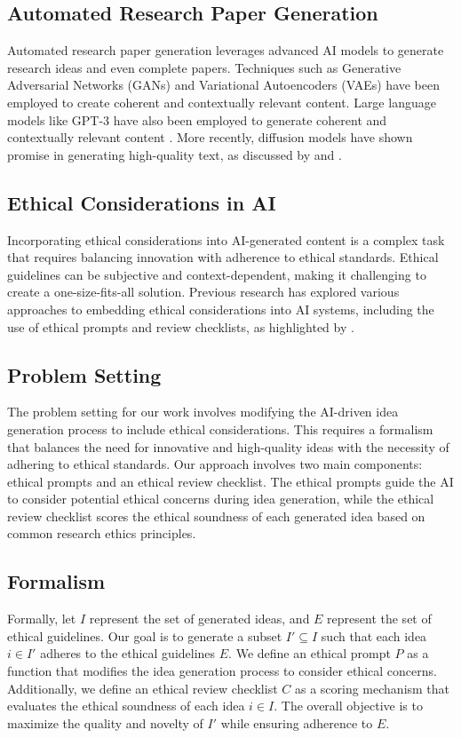 \documentclass{article} %
\begin{document}
\subsection{Automated Research Paper Generation}
Automated research paper generation leverages advanced AI models to generate research ideas and even complete papers. Techniques such as Generative Adversarial Networks (GANs) \citep{gan} and Variational Autoencoders (VAEs) \citep{vae} have been employed to create coherent and contextually relevant content. Large language models like GPT-3 have also been employed to generate coherent and contextually relevant content \citep{Kalyan2023ASO}. More recently, diffusion models have shown promise in generating high-quality text, as discussed by \citet{ddpm} and \citet{edm}.

\subsection{Ethical Considerations in AI}
Incorporating ethical considerations into AI-generated content is a complex task that requires balancing innovation with adherence to ethical standards. Ethical guidelines can be subjective and context-dependent, making it challenging to create a one-size-fits-all solution. Previous research has explored various approaches to embedding ethical considerations into AI systems, including the use of ethical prompts and review checklists, as highlighted by \citet{lu2024aiscientist}.

\subsection{Problem Setting}
The problem setting for our work involves modifying the AI-driven idea generation process to include ethical considerations. This requires a formalism that balances the need for innovative and high-quality ideas with the necessity of adhering to ethical standards. Our approach involves two main components: ethical prompts and an ethical review checklist. The ethical prompts guide the AI to consider potential ethical concerns during idea generation, while the ethical review checklist scores the ethical soundness of each generated idea based on common research ethics principles.

\subsection{Formalism}
Formally, let \( I \) represent the set of generated ideas, and \( E \) represent the set of ethical guidelines. Our goal is to generate a subset \( I' \subseteq I \) such that each idea \( i \in I' \) adheres to the ethical guidelines \( E \). We define an ethical prompt \( P \) as a function that modifies the idea generation process to consider ethical concerns. Additionally, we define an ethical review checklist \( C \) as a scoring mechanism that evaluates the ethical soundness of each idea \( i \in I \). The overall objective is to maximize the quality and novelty of \( I' \) while ensuring adherence to \( E \).
\end{document}
